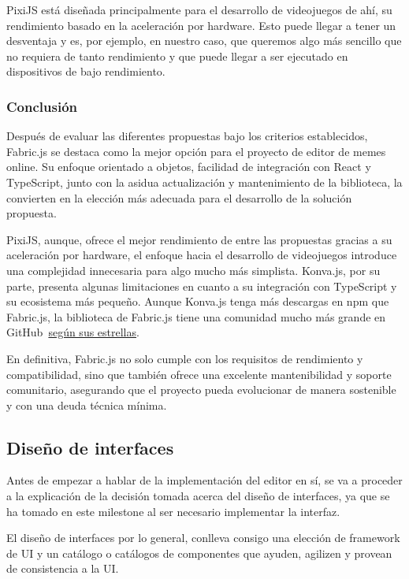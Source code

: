 PixiJS está diseñada principalmente para el desarrollo de videojuegos de ahí, su rendimiento basado en la aceleración por hardware. Esto puede llegar a tener un desventaja y es, por ejemplo, en nuestro caso, que queremos algo más sencillo que no requiera de tanto rendimiento y que puede llegar a ser ejecutado en dispositivos de bajo rendimiento.

\subsubsection{Conclusión}

Después de evaluar las diferentes propuestas bajo los criterios establecidos, Fabric.js se destaca como la mejor opción para el proyecto de editor de memes online. Su enfoque orientado a objetos, facilidad de integración con React y TypeScript, junto con la asidua actualización y mantenimiento de la biblioteca, la convierten en la elección más adecuada para el desarrollo de la solución propuesta.

PixiJS, aunque, ofrece el mejor rendimiento de entre las propuestas gracias a su aceleración por hardware, el enfoque hacia el desarrollo de videojuegos introduce una complejidad innecesaria para algo mucho más simplista. Konva.js, por su parte, presenta algunas limitaciones en cuanto a su integración con TypeScript y su ecosistema más pequeño. Aunque Konva.js tenga más descargas en npm que Fabric.js, la biblioteca de Fabric.js tiene una comunidad mucho más grande en GitHub~\href{https://stackshare.io/stackups/bower-pixi-js-vs-fabricjs-vs-konva#description}{según sus estrellas}.

En definitiva, Fabric.js no solo cumple con los requisitos de rendimiento y compatibilidad, sino que también ofrece una excelente mantenibilidad y soporte comunitario, asegurando que el proyecto pueda evolucionar de manera sostenible y con una deuda técnica mínima.

\subsection{Diseño de interfaces}

Antes de empezar a hablar de la implementación del editor en sí, se va a proceder a la explicación de la decisión tomada acerca del diseño de interfaces, ya que se ha tomado en este milestone al ser necesario implementar la interfaz.

El diseño de interfaces por lo general, conlleva consigo una elección de framework de UI y un catálogo o catálogos de componentes que ayuden, agilizen y provean de consistencia a la UI.

